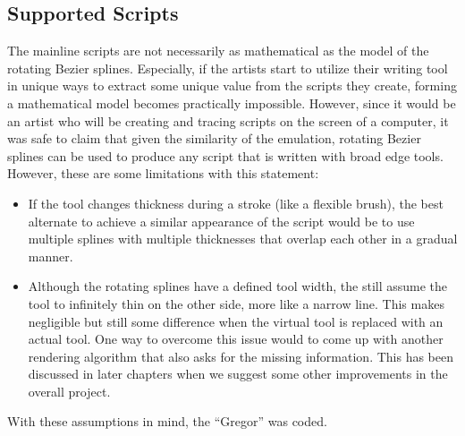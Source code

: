 \subsection{Supported Scripts}
The mainline scripts are not necessarily as mathematical as the model of the rotating Bezier splines. Especially, if the artists start to utilize their writing tool in unique ways to extract some unique value from the scripts they create, forming a mathematical model becomes practically impossible. However, since it would be an artist who will be creating and tracing scripts on the screen of a computer, it was safe to claim that given the similarity of the emulation, rotating Bezier splines can be used to produce any script that is written with broad edge tools. However, these are some limitations with this statement:

\begin{itemize}
\item If the tool changes thickness during a stroke (like a flexible brush), the best alternate to achieve a similar appearance of the script would be to use multiple splines with multiple thicknesses that overlap each other in a gradual manner.
\item Although the rotating splines have a defined tool width, the still assume the tool to infinitely thin on the other side, more like a narrow line. This makes negligible but still some difference when the virtual tool is replaced with an actual tool. One way to overcome this issue would to come up with another rendering algorithm that also asks for the missing information. This has been discussed in later chapters when we suggest some other improvements in the overall project.
\end{itemize}
With these assumptions in mind, the “Gregor” was coded.

